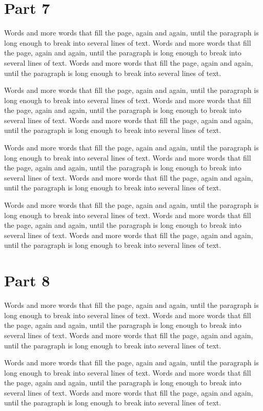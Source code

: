 \documentclass{article}
\begin{document}
\section{Part 7}
Words and more words that fill the page, again and again, until the paragraph is long enough to break into several lines of text. Words and more words that fill the page, again and again, until the paragraph is long enough to break into several lines of text. Words and more words that fill the page, again and again, until the paragraph is long enough to break into several lines of text. 

Words and more words that fill the page, again and again, until the paragraph is long enough to break into several lines of text. Words and more words that fill the page, again and again, until the paragraph is long enough to break into several lines of text. Words and more words that fill the page, again and again, until the paragraph is long enough to break into several lines of text. 

Words and more words that fill the page, again and again, until the paragraph is long enough to break into several lines of text. Words and more words that fill the page, again and again, until the paragraph is long enough to break into several lines of text. Words and more words that fill the page, again and again, until the paragraph is long enough to break into several lines of text. 

Words and more words that fill the page, again and again, until the paragraph is long enough to break into several lines of text. Words and more words that fill the page, again and again, until the paragraph is long enough to break into several lines of text. Words and more words that fill the page, again and again, until the paragraph is long enough to break into several lines of text. 

\section{Part 8}
Words and more words that fill the page, again and again, until the paragraph is long enough to break into several lines of text. Words and more words that fill the page, again and again, until the paragraph is long enough to break into several lines of text. Words and more words that fill the page, again and again, until the paragraph is long enough to break into several lines of text. 

Words and more words that fill the page, again and again, until the paragraph is long enough to break into several lines of text. Words and more words that fill the page, again and again, until the paragraph is long enough to break into several lines of text. Words and more words that fill the page, again and again, until the paragraph is long enough to break into several lines of text. 
\end{document}
